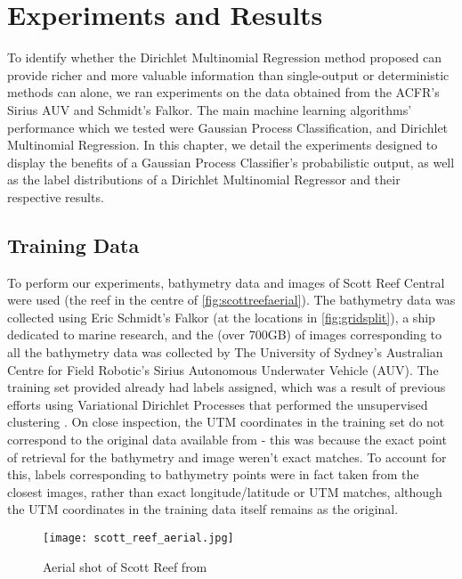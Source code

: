 \makeatletter
\renewcommand{\fnum@figure}{Figure \thefigure}
\makeatother

\chapter{Experiments and Results} \label{chap:experiments}

To identify whether the Dirichlet Multinomial Regression method proposed can provide richer and more valuable information than single-output or deterministic methods can alone, we ran experiments on the data obtained from the ACFR's Sirius AUV and Schmidt's Falkor. The main machine learning algorithms' performance which we tested were Gaussian Process Classification, and Dirichlet Multinomial Regression. In this chapter, we detail the experiments designed to display the benefits of a Gaussian Process Classifier's probabilistic output, as well as the label distributions of a Dirichlet Multinomial Regressor and their respective results. 

\section{Training Data}
To perform our experiments, bathymetry data and images of Scott Reef Central were used (the reef in the centre of \autoref{fig:scottreefaerial}). The bathymetry data was collected using Eric Schmidt's Falkor (at the locations in \autoref{fig:gridsplit}), a ship dedicated to marine research, and the (over 700GB) of images corresponding to all the bathymetry data was collected by The University of Sydney's Australian Centre for Field Robotic's Sirius Autonomous Underwater Vehicle (AUV). The training set provided already had labels assigned, which was a result of previous efforts using Variational Dirichlet Processes that performed the unsupervised clustering \citep{steinberg11}. On close inspection, the UTM coordinates in the training set do not correspond to the original data available from \cite{squidle} - this was because the exact point of retrieval for the bathymetry and image weren't exact matches. To account for this, labels corresponding to bathymetry points were in fact taken from the closest images, rather than exact longitude/latitude or UTM matches, although the UTM coordinates in the training data itself remains as the original.


\begin{figure}
    \texttt{[image: scott\_reef\_aerial.jpg]}
    \caption{Aerial shot of Scott Reef from \cite{NASA:SRI}}
    \label{fig:scottreefaerial}
\end{figure}

